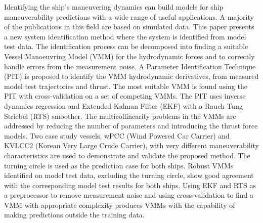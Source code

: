 Identifying the ship's maneuvering dynamics can build models for ship maneuverability predictions
with a wide range of useful applications. A majority of the publications in this field are based on
simulated data. This paper presents a new system identification method where the system is
identified from model test data. The identification process can be decomposed into finding a suitable
Vessel Manoeuvring Model (VMM) for the hydrodynamic forces and to correctly handle errors from the
measurement noise. A Parameter Identification Technique (PIT) is proposed to identify the VMM hydrodynamic derivatives, from measured model test trajectories and thrust. The most suitable VMM
is found using the PIT with cross-validation on a set of competing VMMs. The PIT uses inverse
dynamics regression and Extended Kalman Filter (EKF) with a Rauch Tung Striebel (RTS) smoother. The
multicollinearity problems in the VMMs are addressed by reducing the number of parameters and introducing
the thrust force models. Two case study vessels, wPCC (Wind Powered Car Carrier) and KVLCC2 (Korean Very Large Crude Carrier), with very different maneuverability
characteristics are used to demonstrate and validate the proposed method. The turning circle is used as the
prediction case for both ships. Robust VMMs identified on model test data, excluding the turning circle, show
good agreement with the corresponding model test results for both ships. Using EKF and RTS as a
preprocessor to remove measurement noise and using cross-validation to find a VMM with appropriate
complexity produces VMMs with the capability of making predictions outside the training data.
